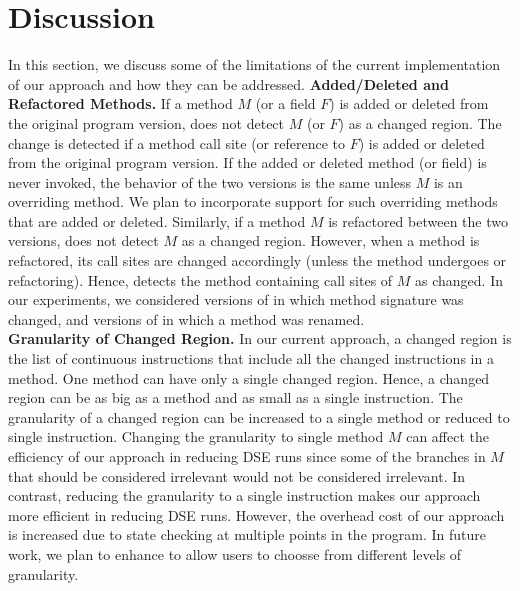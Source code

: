 
\section{Discussion}

\label{sec:discussion}
In this section, we discuss some of the limitations of the current implementation of our approach and
how they can be addressed.
\textbf{Added/Deleted and Refactored Methods.} If a method $M$ (or a field $F$) is added or deleted from the original program version,  does not detect $M$ (or $F$) as a changed region. The change is detected if a method call site (or reference to $F$) is added or deleted from the original program version. If the added or deleted method (or field) is never invoked, the behavior of the two versions is the same unless $M$  is an overriding method. We plan to incorporate support for such overriding methods that are added or deleted. Similarly, if a method $M$ is refactored between the two versions,  does not detect $M$ as a changed region. However, when a method is refactored, its call sites are changed accordingly (unless the method undergoes  or  refactoring). Hence,  detects the method containing call sites of $M$ as changed. In our experiments, we considered versions of  in which method signature was changed, and versions of  in which a method was renamed.
\\ \textbf{Granularity of Changed Region.} In our current approach, a changed region is the list of continuous instructions that include all the changed instructions in a method. One method can have only a single changed region. Hence, a changed region can be as big as a method and as small as a single instruction. The granularity of a changed region can be increased to a single method or reduced to single instruction. Changing the granularity to single method $M$ can affect the efficiency of our approach in reducing DSE runs since some of the branches in $M$ that should be considered irrelevant would not be considered irrelevant. In contrast, reducing the granularity to a single instruction makes our approach more efficient in reducing DSE runs. However, the overhead cost of our approach is increased due to state checking at multiple points in the program. In future work, we plan to enhance  to allow users to choosse from different levels of granularity.
